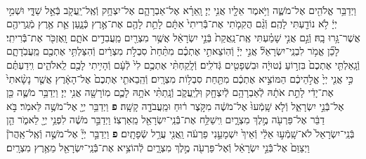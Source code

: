\documentclass[twoside, openany, parskip=half, 11pt]{book}
\begin{document}
\begin{sometimes}
\begin{footnotesize}
\begin{multicols}{2}
\\
וַיְדַבֵּ֥ר אֱלֹהִ֖ים אֶל־מֹשֶׁ֑ה וַיֹּ֥אמֶר אֵלָ֖יו אֲנִ֥י יְיָ׃ וָֽאֵרָ֗א אֶל־אַבְרָהָ֛ם אֶל־יִצְחָ֥ק וְֿאֶֽל־יַֽעֲקֹ֖ב בְּֿאֵ֣ל שַׁדָּ֑י וּשְׁמִ֣י יְיָ֔ לֹ֥א נוֹדַ֖עְתִּי לָהֶֽם׃ וְֿגַ֨ם הֲקִמֹ֤תִי אֶת־בְּֿֿרִיתִי֙ אִתָּ֔ם לָתֵ֥ת לָהֶ֖ם אֶת־אֶ֣רֶץ כְּֿנָ֑עַן אֵ֛ת אֶ֥רֶץ מְֿגֻֽרֵיהֶ֖ם אֲשֶׁר־גָּ֥רוּ בָֽהּ׃ וְֿגַ֣ם אֲנִ֣י שָׁמַ֗עְתִּי אֶֽת־נַֽאֲקַת֙ בְּֿנֵ֣י יִשְׂרָאֵ֔ל אֲשֶׁ֥ר מִצְרַ֖יִם מַֽעֲבִדִ֣ים אֹתָ֑ם וָֽאֶזְכֹּ֖ר אֶת־בְּֿֿרִיתִֽי׃  לָכֵ֞ן אֱמֹ֥ר לִבְנֵֽי־יִשְׂרָאֵל֘ אֲנִ֣י יְיָ֒ וְֿהֽוֹצֵאתִ֣י אֶתְכֶ֗ם מִתַּ֨חַת֙ סִבְלֹ֣ת מִצְרַ֔יִם וְֿהִצַּלְתִּ֥י אֶתְכֶ֖ם מֵֽעֲבֹֽדָתָ֑ם וְֿגָֽאַלְתִּ֤י אֶתְכֶם֙ בִּזְר֣וֹעַ נְֿטוּיָ֔ה וּבִשְׁפָטִ֖ים גְּֿדֹלִֽים׃ וְֿלָֽקַחְתִּ֨י אֶתְכֶ֥ם לִי֙ לְֿעָ֔ם וְֿהָיִ֥יתִי לָכֶ֖ם לֵֽאלֹהִ֑ים וִֽידַעְתֶּ֗ם כִּ֣י אֲנִ֤י יְיָ֙ אֱלֹ֣הֵיכֶ֔ם הַמּוֹצִ֣יא אֶתְכֶ֔ם מִתַּ֖חַת סִבְל֥וֹת מִצְרָֽיִם׃ וְֿהֵֽבֵאתִ֤י אֶתְכֶם֙ אֶל־הָאָ֔רֶץ אֲשֶׁ֤ר נָשָׂ֨אתִי֙ אֶת־יָדִ֔י לָתֵ֣ת אֹתָ֔הּ לְֿאַבְרָהָ֥ם לְֿיִצְחָ֖ק וּֽלְיַֽעֲקֹ֑ב וְֿנָֽתַתִּ֨י אֹתָ֥הּ לָכֶ֛ם מֽוֹרָשָׁ֖ה אֲנִ֥י יְיָ׃ וַיְדַבֵּ֥ר מֹשֶׁ֛ה כֵּ֖ן אֶל־בְּֿֿנֵ֣י יִשְׂרָאֵ֑ל וְֿלֹ֤א שָֽׁמְֿעוּ֙ אֶל־מֹשֶׁ֔ה מִקֹּ֣צֶר ר֔וּחַ וּמֵֽעֲבֹדָ֖ה קָשָֽׁה׃ \textbf{פ}
וַיְדַבֵּ֥ר יְיָ֖ אֶל־מֹשֶׁ֥ה לֵּאמֹֽר׃ בֹּ֣א דַבֵּ֔ר אֶל־פַּרְעֹ֖ה מֶ֣לֶךְ מִצְרָ֑יִם וִֽישַׁלַּ֥ח אֶת־בְּֿֿנֵֽי־יִשְׂרָאֵ֖ל מֵֽאַרְצֽוֹ׃ וַיְדַבֵּ֣ר מֹשֶׁ֔ה לִפְנֵ֥י יְיָ֖ לֵאמֹ֑ר הֵ֤ן בְּֿנֵֽי־יִשְׂרָאֵל֙ לֹא־שָֽׁמְֿע֣וּ אֵלַ֔י וְֿאֵיךְ֙ יִשְׁמָעֵ֣נִי פַרְעֹ֔ה וַֽאֲנִ֖י עֲרַ֥ל שְֿׂפָתָֽיִם׃ \textbf{פ}
וַיְדַבֵּ֣ר יְיָ֘ אֶל־מֹשֶׁ֣ה וְֿאֶֽל־אַֽהֲרֹן֒ וַיְצַוֵּם֙ אֶל־בְּֿֿנֵ֣י יִשְׂרָאֵ֔ל וְֿאֶל־פַּרְעֹ֖ה מֶ֣לֶךְ מִצְרָ֑יִם לְֿהוֹצִ֥יא אֶת־בְּֿֿנֵֽי־יִשְׂרָאֵ֖ל מֵאֶ֥רֶץ מִצְרָֽיִם׃


\end{multicols}
\end{footnotesize}
\end{sometimes}
\end{document}
